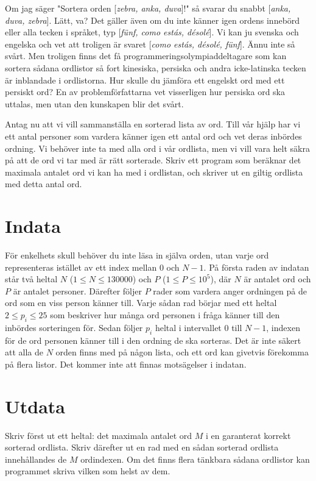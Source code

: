 
Om jag säger "Sortera orden [\emph{zebra, anka, duva}]!" så svarar du snabbt [\emph{anka, duva, zebra}]. Lätt, va? Det gäller även om du inte känner igen ordens innebörd eller alla tecken i språket, typ [\emph{fünf, como estás, désolé}]. Vi kan ju svenska och engelska och vet att troligen är svaret [\emph{como estás, désolé, fünf}]. Ännu inte så svårt. Men troligen finns det få programmeringsolympiaddeltagare som kan sortera sådana ordlistor så fort kinesiska, persiska och andra icke-latinska tecken är inblandade i ordlistorna. Hur skulle du jämföra ett engelskt ord med ett persiskt ord? En av problemförfattarna vet visserligen hur persiska ord ska uttalas, men utan den kunskapen blir det svårt.


Antag nu att vi vill sammanställa en sorterad lista av ord. Till vår hjälp har vi ett antal personer som vardera känner igen ett antal ord och vet deras inbördes ordning. Vi behöver inte ta med alla ord i vår ordlista, men vi vill vara helt säkra på att de ord vi tar med är rätt sorterade. Skriv ett program som beräknar det maximala antalet ord vi kan ha med i ordlistan, och skriver ut en giltig ordlista med detta antal ord.

\section*{Indata}
För enkelhets skull behöver du inte läsa in själva orden, utan varje ord representeras istället av ett index mellan $0$ och $N-1$. På första raden av indatan står två heltal $N$ ($1 \leq N \leq 130000$) och $P$ ($1 \leq P \leq 10^5$), där $N$ är antalet ord och $P$ är antalet personer. Därefter följer $P$ rader som vardera anger ordningen på de ord som en viss person känner till. Varje sådan rad börjar med ett heltal $2 \leq p_i \leq 25$ som beskriver hur många ord personen i fråga känner till den inbördes sorteringen för. Sedan följer $p_i$ heltal i intervallet $0$ till $N-1$, indexen för de ord personen känner till i den ordning de ska sorteras. Det är inte säkert att alla de $N$ orden finns med på någon lista, och ett ord kan givetvis förekomma på flera listor. Det kommer inte att finnas motsägelser i indatan.


\section*{Utdata}
Skriv först ut ett heltal: det maximala antalet ord $M$ i en garanterat korrekt sorterad ordlista. Skriv därefter
ut en rad med en sådan sorterad ordlista innehållandes de $M$ ordindexen. Om det finns flera tänkbara sådana
ordlistor kan programmet skriva vilken som helst av dem.



